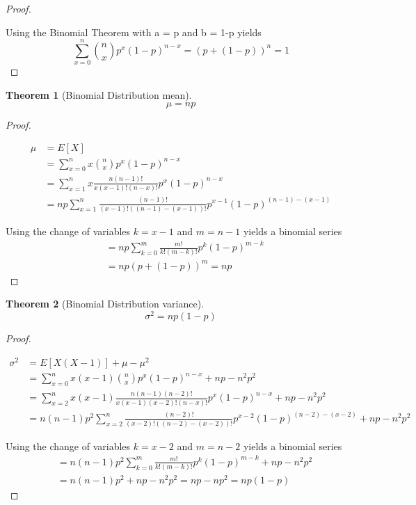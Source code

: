 \documentclass[10pt,]{book}
\theoremstyle{plain}
\newtheorem{theorem}{Theorem}[section]
\theoremstyle{definition}
\theoremstyle{definition}
\theoremstyle{definition}
\numberwithin{equation}{section}
\begin{document}
\begin{proof}\hypertarget{proof-35}{}

		Using the Binomial Theorem with a = p and b = 1-p yields
		\begin{equation*}\sum_{x=0}^n \binom{n}{x}p^x(1-p)^{n-x} = (p + (1-p))^n = 1\end{equation*}
\end{proof}
\begin{theorem}[{Binomial Distribution mean}]\label{theorem-39}
\begin{equation*}\mu = np\end{equation*}\end{theorem}
\begin{proof}\hypertarget{proof-36}{}

		\begin{align*}
 \mu & = E[X] \\
 & = \sum_{x=0}^{n} {x \binom{n}{x} p^x (1-p)^{n-x}}\\
 & = \sum_{x=1}^{n} {x \frac{n(n-1)!}{x(x-1)!(n-x)!} p^x (1-p)^{n-x}}\\
 & = np \sum_{x=1}^{n} {\frac{(n-1)!}{(x-1)!((n-1)-(x-1))!} p^{x-1} (1-p)^{(n-1)-(x-1)}}
\end{align*}

		Using the change of variables \(k=x-1\) and \(m = n-1\) yields a binomial series
		\begin{align*}
 & = np \sum_{k=0}^{m} {\frac{m!}{k!(m-k)!} p^k (1-p)^{m-k}}\\
 & = np (p + (1-p))^m = np
\end{align*}
\end{proof}
\begin{theorem}[{Binomial Distribution variance}]\label{theorem-40}
\begin{equation*}\sigma^2 = np(1-p)\end{equation*}\end{theorem}
\begin{proof}\hypertarget{proof-37}{}

		\begin{align*}
 \sigma^2 & = E[X(X-1)] + \mu - \mu^2 \\
 & = \sum_{x=0}^{n} {x(x-1) \binom{n}{x} p^x (1-p)^{n-x}} + np - n^2p^2\\
 & = \sum_{x=2}^{n} {x(x-1) \frac{n(n-1)(n-2)!}{x(x-1)(x-2)!(n-x)!} p^x (1-p)^{n-x}}  + np - n^2p^2\\
 & = n(n-1)p^2 \sum_{x=2}^{n} {\frac{(n-2)!}{(x-2)!((n-2)-(x-2))!} p^{x-2} (1-p)^{(n-2)-(x-2)}} + np - n^2p^2
\end{align*}
\par
Using the change of variables \(k=x-2\) and \(m = n-2\) yields a binomial series
	\begin{align*}
 & = n(n-1)p^2  \sum_{k=0}^{m} {\frac{m!}{k!(m-k)!} p^k (1-p)^{m-k}} + np - n^2p^2\\
 & = n(n-1)p^2 + np - n^2p^2 = np - np^2 = np(1-p)
\end{align*}
\end{proof}
\end{document}
